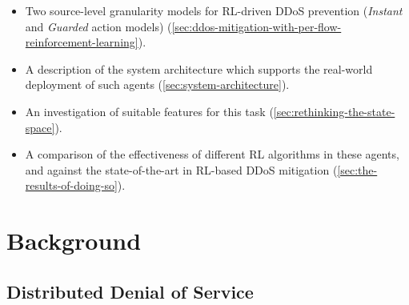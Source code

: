 \documentclass[10pt, times, conference, letterpaper]{IEEEtran}
\begin{document}
\begin{itemize}
	\item Two source-level granularity models for RL-driven DDoS prevention (\emph{Instant} and \emph{Guarded} action models) (\cref{sec:ddos-mitigation-with-per-flow-reinforcement-learning}).
	\item A description of the system architecture which supports the real-world deployment of such agents (\cref{sec:system-architecture}).
	\item An investigation of suitable features for this task (\cref{sec:rethinking-the-state-space}).
	\item A comparison of the effectiveness of different RL algorithms in these agents, and against the state-of-the-art in RL-based DDoS mitigation (\cref{sec:the-results-of-doing-so}).
\end{itemize}

\section{Background}

\subsection{Distributed Denial of Service}
\end{document}
